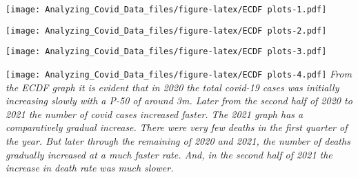 \documentclass[
]{article}
\newenvironment{Shaded}{\begin{snugshade}}{\end{snugshade}}
\newcommand{\CommentTok}[1]{\textcolor[rgb]{0.56,0.35,0.01}{\textit{#1}}}
\newcommand{\FunctionTok}[1]{\textcolor[rgb]{0.13,0.29,0.53}{\textbf{#1}}}
\newcommand{\NormalTok}[1]{#1}
\newcommand{\SpecialCharTok}[1]{\textcolor[rgb]{0.81,0.36,0.00}{\textbf{#1}}}
\newcommand{\StringTok}[1]{\textcolor[rgb]{0.31,0.60,0.02}{#1}}
\begin{document}
\texttt{[image: Analyzing\_Covid\_Data\_files/figure-latex/ECDF plots-1.pdf]}

\begin{Shaded}
\end{Shaded}

\texttt{[image: Analyzing\_Covid\_Data\_files/figure-latex/ECDF plots-2.pdf]}

\begin{Shaded}
\end{Shaded}

\texttt{[image: Analyzing\_Covid\_Data\_files/figure-latex/ECDF plots-3.pdf]}

\begin{Shaded}
\end{Shaded}

\texttt{[image: Analyzing\_Covid\_Data\_files/figure-latex/ECDF plots-4.pdf]}
\emph{From the ECDF graph it is evident that in 2020 the total covid-19
cases was initially increasing slowly with a P-50 of around 3m. Later
from the second half of 2020 to 2021 the number of covid cases increased
faster. The 2021 graph has a comparatively gradual increase. }
\emph{There were very few deaths in the first quarter of the year. But
later through the remaining of 2020 and 2021, the number of deaths
gradually increased at a much faster rate. And, in the second half of
2021 the increase in death rate was much slower. }
\end{document}
